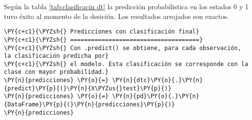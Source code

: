 \begin{table}[H]
\centering
\setlength{\tabcolsep}{10pt}
\caption{Predicciones probabilísticas para cada observación Decision Tree
}
\label{tab:clasificacin dt}
\end{table}
        
    Según la tabla \ref{tab:clasificacin dt} la predicción probabilistica en los estados 0 y 1 tuvo éxito al momento
de la desición. Los resultados arrojados son exactos.

    \begin{tcolorbox}[breakable, size=fbox, boxrule=1pt, pad at break*=1mm,colback=cellbackground, colframe=cellborder]
\begin{Verbatim}[commandchars=\\\{\}]
\PY{c+c1}{\PYZsh{} Predicciones con clasificación final}
\PY{c+c1}{\PYZsh{} =====================================}
\PY{c+c1}{\PYZsh{} Con .predict() se obtiene, para cada observación, la clasificación predicha por}
\PY{c+c1}{\PYZsh{} el modelo. Esta clasificación se corresponde con la clase con mayor probabilidad.}
\PY{n}{predicciones} \PY{o}{=} \PY{n}{dtc}\PY{o}{.}\PY{n}{predict}\PY{p}{(}\PY{n}{X\PYZus{}test}\PY{p}{)}
\PY{n}{predicciones} \PY{o}{=} \PY{n}{pd}\PY{o}{.}\PY{n}{DataFrame}\PY{p}{(}\PY{n}{predicciones}\PY{p}{)}
\PY{n}{predicciones}
\end{Verbatim}
\end{tcolorbox}

